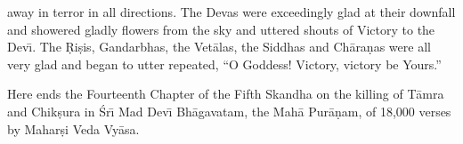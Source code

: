 away in terror in all directions. The Devas were exceedingly glad at their downfall and showered gladly flowers from the sky and uttered shouts of Victory to the Dev\={\i}. The \d{R}i\d{s}is, Gandarbhas, the Vet\=alas, the Siddhas and Ch\=ara\d{n}as were all very glad and began to utter repeated, ``O Goddess! Victory, victory be Yours.''

Here ends the Fourteenth Chapter of the Fifth Skandha on the killing of T\=amra and Chik\d{s}ura in \'Sr\={\i} Mad Dev\={\i} Bh\=agavatam, the Mah\=a Pur\=a\d{n}am, of 18,000 verses by Mahar\d{s}i Veda Vy\=asa.



